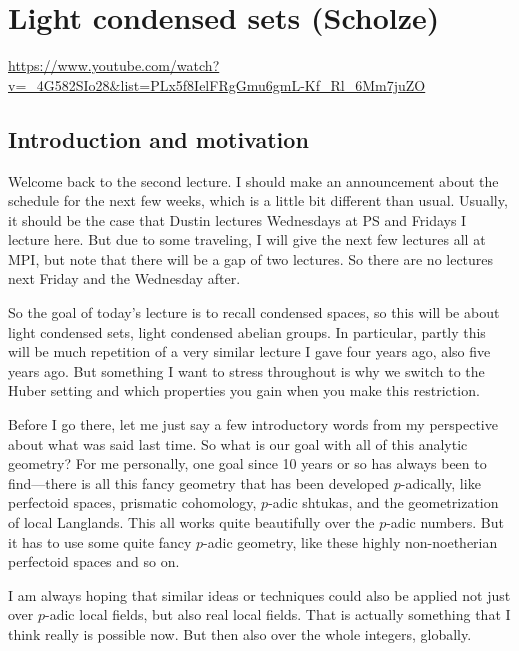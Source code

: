 
\section{\ufs Light condensed sets (Scholze)}

\url{https://www.youtube.com/watch?v=_4G582SIo28&list=PLx5f8IelFRgGmu6gmL-Kf_Rl_6Mm7juZO}
\renewcommand{\yt}[2]{\href{https://www.youtube.com/watch?v=_4G582SIo28&list=PLx5f8IelFRgGmu6gmL-Kf_Rl_6Mm7juZO&t=#1}{#2}}
\vspace{1em}

\subsection{Introduction and motivation}

Welcome back to the second lecture. I should make an announcement about the schedule for the next few weeks, which is a little bit different than usual. Usually, it should be the case that Dustin lectures Wednesdays at PS and Fridays I lecture here. But due to some traveling, I will give the next few lectures all at MPI, but note that there will be a gap of two lectures. So there are no lectures next Friday and the Wednesday after.

So the goal of today's lecture is to recall condensed spaces, so this will be about light condensed sets, light condensed abelian groups. In particular, partly this will be much repetition of a very similar lecture I gave four years ago, also five years ago. But something I want to stress throughout is why we switch to the Huber setting and which properties you gain when you make this restriction.

Before I go there, let me just say a few introductory words from my perspective about what was said last time. So what is our goal with all of this analytic geometry? For me personally, one goal since 10 years or so has always been to find---there is all this fancy geometry that has been developed $p$-adically, like perfectoid spaces, prismatic cohomology, $p$-adic shtukas, and the geometrization of local Langlands. This all works quite beautifully over the $p$-adic numbers. But it has to use some quite fancy $p$-adic geometry, like these highly non-noetherian perfectoid spaces and so on.

I am always hoping that similar ideas or techniques could also be applied not just over $p$-adic local fields, but also real local fields. That is actually something that I think really is possible now. But then also over the whole integers, globally.


